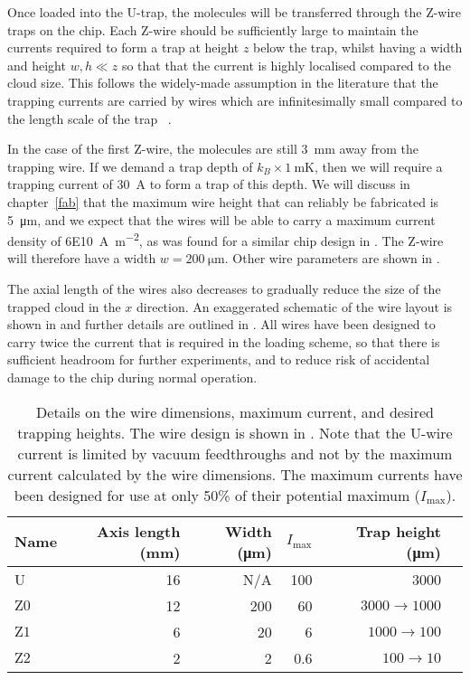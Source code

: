 Once loaded into the U-trap, the molecules will be transferred through the
Z-wire traps on the chip. Each Z-wire should be sufficiently
large to maintain the currents required to form a trap at height $z$ below the
trap, whilst having a width and height  $w, h \ll z$ so that that the current
is highly localised compared to the cloud size.  This follows the widely-made
assumption in the literature that the trapping currents are carried by wires
which are infinitesimally small compared to the length scale of the trap
~\cite{2011Ac}.

In the case of the first Z-wire, the molecules are still \SI{3}{\milli\meter}
away from the trapping wire. If we demand a trap depth of
$k_B\times\SI{1}{\milli\kelvin}$, then we will require a trapping current of
\SI{30}{\ampere} to form a trap of this depth.  We will discuss in
chapter~\ref{fab} that the maximum wire height that can reliably be fabricated
is \SI{5}{\micro\meter}, and we expect that the wires will be able to carry a
maximum current density of \SI{6E10}{\ampere\per\meter\squared}, as was found
for a similar chip design in . The Z-wire will
therefore have a width $w=\SI{200}{\micro\meter}$. Other wire parameters are
shown in .

The axial length of the wires also decreases to gradually reduce the size of
the trapped cloud in the $x$ direction. An exaggerated schematic of the wire
layout is shown in  and further details are
outlined in . All wires have been designed to
carry twice the current that is required in the loading scheme, so that there
is sufficient headroom for further experiments, and to reduce risk of
accidental damage to the chip during normal operation.

\begin{table}
  \centering
\begin{tabular}{lrrrrr}
  Name & Axis length (\si{\milli\meter}) & Width (\si{\micro\meter})& $I_\text{max}$ & Trap height (\si{\micro\meter}) \\
 \hline
  U & 16 & N/A& 100 & 3000\\
  $\mathrm{Z0}$ & 12 & 200& 60& $3000\rightarrow1000$ \\
  $\mathrm{Z1}$ &  6 & 20& 6& $1000\rightarrow100$ \\
  $\mathrm{Z2}$ &  2 & 2& 0.6& $100\rightarrow10$ \\
 \hline
\end{tabular}
  \caption{Details on the wire dimensions, maximum current, and desired
  trapping heights. The wire design is shown in
  . Note that the U-wire current is
  limited by vacuum feedthroughs and not by the maximum current calculated by
  the wire dimensions.  The maximum currents have been designed for use at only
  50\% of their potential maximum ($I_\text{max}$).
  }
  \label{overview:table:wires}
\end{table}

